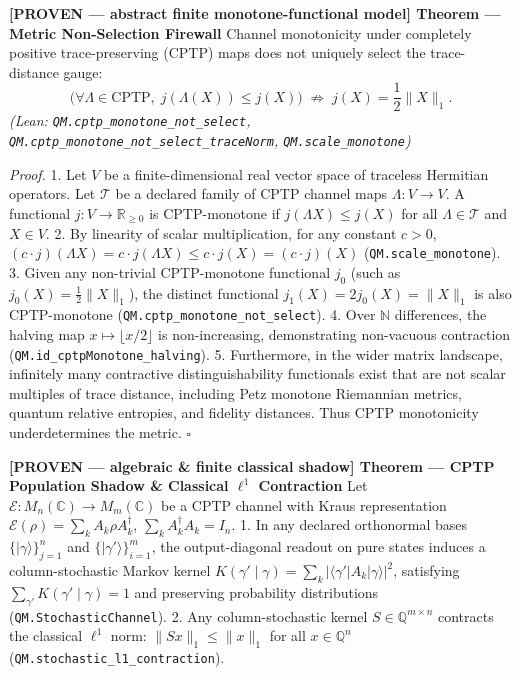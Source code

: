 \documentclass[
  11pt,
]{article}
\renewenvironment{quote}
  {\begin{leftbar}\small}
  {\end{leftbar}}
\begin{document}
\begin{quote}
\textbf{{[}PROVEN --- abstract finite monotone-functional model{]} Theorem --- Metric Non-Selection Firewall}
Channel monotonicity under completely positive trace-preserving (CPTP) maps does not uniquely select the trace-distance gauge:
\[\big(\forall \Lambda \in \mathrm{CPTP},\; j(\Lambda(X)) \le j(X)\big) \;\not\Longrightarrow\; j(X) = \frac{1}{2}\|X\|_1.\]
\emph{(Lean: \texttt{QM.cptp\_monotone\_not\_select}, \texttt{QM.cptp\_monotone\_not\_select\_traceNorm}, \texttt{QM.scale\_monotone})}

\emph{Proof.}
1. Let \(V\) be a finite-dimensional real vector space of traceless Hermitian operators. Let \(\mathcal{T}\) be a declared family of CPTP channel maps \(\Lambda: V \to V\). A functional \(j: V \to \mathbb{R}_{\ge 0}\) is CPTP-monotone if \(j(\Lambda X) \le j(X)\) for all \(\Lambda \in \mathcal{T}\) and \(X \in V\).
2. By linearity of scalar multiplication, for any constant \(c > 0\), \((c \cdot j)(\Lambda X) = c \cdot j(\Lambda X) \le c \cdot j(X) = (c \cdot j)(X)\) (\texttt{QM.scale\_monotone}).
3. Given any non-trivial CPTP-monotone functional \(j_0\) (such as \(j_0(X) = \frac{1}{2}\|X\|_1\)), the distinct functional \(j_1(X) = 2 j_0(X) = \|X\|_1\) is also CPTP-monotone (\texttt{QM.cptp\_monotone\_not\_select}).
4. Over \(\mathbb{N}\) differences, the halving map \(x \mapsto \lfloor x/2 \rfloor\) is non-increasing, demonstrating non-vacuous contraction (\texttt{QM.id\_cptpMonotone\_halving}).
5. Furthermore, in the wider matrix landscape, infinitely many contractive distinguishability functionals exist that are not scalar multiples of trace distance, including Petz monotone Riemannian metrics, quantum relative entropies, and fidelity distances. Thus CPTP monotonicity underdetermines the metric. \(\square\)

\textbf{{[}PROVEN --- algebraic \& finite classical shadow{]} Theorem --- CPTP Population Shadow \& Classical \(\ell^1\) Contraction}
Let \(\mathcal{E}: M_n(\mathbb{C}) \to M_m(\mathbb{C})\) be a CPTP channel with Kraus representation \(\mathcal{E}(\rho) = \sum_k A_k \rho A_k^\dagger\), \(\sum_k A_k^\dagger A_k = I_n\).
1. In any declared orthonormal bases \(\{|\gamma\rangle\}_{j=1}^n\) and \(\{|\gamma'\rangle\}_{i=1}^m\), the output-diagonal readout on pure states induces a column-stochastic Markov kernel \(K(\gamma'\mid\gamma) = \sum_k |\langle\gamma'|A_k|\gamma\rangle|^2\), satisfying \(\sum_{\gamma'} K(\gamma'\mid\gamma) = 1\) and preserving probability distributions (\texttt{QM.StochasticChannel}).
2. Any column-stochastic kernel \(S \in \mathbb{Q}^{m \times n}\) contracts the classical \(\ell^1\) norm: \(\|Sx\|_1 \le \|x\|_1\) for all \(x \in \mathbb{Q}^n\) (\texttt{QM.stochastic\_l1\_contraction}).


\end{quote}
\end{document}
